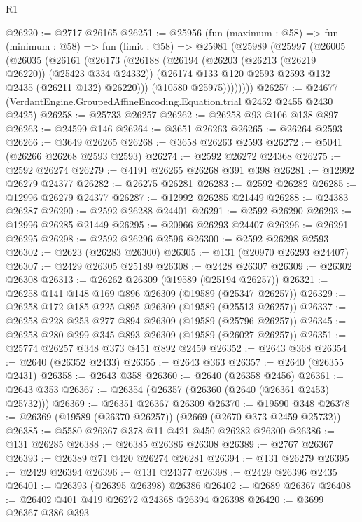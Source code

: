 \begin{lexlean}{R1}
\begin{coremodule}
@26220 := @2717 @26165
@26251 := @25956
    (fun (maximum : @58) =>
    fun (minimum : @58) =>
    fun (limit : @58) =>
    @25981
      (@25989
        (@25997
          (@26005
            (@26035
              (@26161
                (@26173
                  (@26188
                    (@26194
                      (@26203 (@26213 (@26219 @26220)) (@25423 @334 @24332))
                      (@26174 @133 @120 @2593 @2593 @132 @2435 (@26211 @132) @26220)))
                  (@10580 @25975))))))))
@26257 := @24677 (VerdantEngine.GroupedAffineEncoding.Equation.trial @2452 @2455 @2430 @2425)
@26258 := @25733 @26257
@26262 := @26258 @93 @106 @138 @897
@26263 := @24599 @146
@26264 := @3651 @26263
@26265 := @26264 @2593
@26266 := @3649 @26265
@26268 := @3658 @26263 @2593
@26272 := @5041 (@26266 @26268 @2593 @2593)
@26274 := @2592 @26272 @24368
@26275 := @2592 @26274
@26279 := @4191 @26265 @26268 @391 @398
@26281 := @12992 @26279 @24377
@26282 := @26275 @26281
@26283 := @2592 @26282
@26285 := @12996 @26279 @24377
@26287 := @12992 @26285 @21449
@26288 := @24383 @26287
@26290 := @2592 @26288 @24401
@26291 := @2592 @26290
@26293 := @12996 @26285 @21449
@26295 := @20966 @26293 @24407
@26296 := @26291 @26295
@26298 := @2592 @26296 @2596
@26300 := @2592 @26298 @2593
@26302 := @2623 (@26283 @26300)
@26305 := @131 (@20970 @26293 @24407)
@26307 := @2429 @26305 @25189
@26308 := @2428 @26307
@26309 := @26302 @26308
@26313 := @26262 @26309 (@19589 (@25194 @26257))
@26321 := @26258 @141 @148 @169 @896 @26309 (@19589 (@25347 @26257))
@26329 := @26258 @172 @185 @225 @895 @26309 (@19589 (@25513 @26257))
@26337 := @26258 @228 @253 @277 @894 @26309 (@19589 (@25796 @26257))
@26345 := @26258 @280 @299 @345 @893 @26309 (@19589 (@26027 @26257))
@26351 := @25774 @26257 @348 @373 @451 @892 @2459
@26352 := @2643 @368
@26354 := @2640 (@26352 @2433)
@26355 := @2643 @363
@26357 := @2640 (@26355 @2431)
@26358 := @2643 @358
@26360 := @2640 (@26358 @2456)
@26361 := @2643 @353
@26367 := @26354 (@26357 (@26360 (@2640 (@26361 @2453) @25732)))
@26369 := @26351 @26367 @26309
@26370 := @19590 @348
@26378 := @26369 (@19589 (@26370 @26257)) (@2669 (@2670 @373 @2459 @25732))
@26385 := @5580 @26367 @378 @11 @421 @450 @26282 @26300
@26386 := @131 @26285
@26388 := @26385 @26386 @26308
@26389 := @2767 @26367
@26393 := @26389 @71 @420 @26274 @26281
@26394 := @131 @26279
@26395 := @2429 @26394
@26396 := @131 @24377
@26398 := @2429 @26396 @2435
@26401 := @26393 (@26395 @26398) @26386
@26402 := @2689 @26367
@26408 := @26402 @401 @419 @26272 @24368 @26394 @26398
@26420 := @3699
    @26367
    @386
    @393

\end{coremodule}
\end{lexlean}
